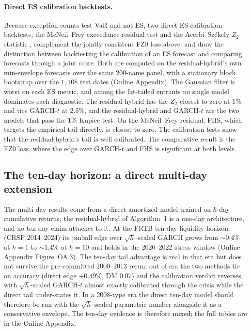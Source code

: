\documentclass[11pt]{article}
\theoremstyle{remark}
\begin{document}
\paragraph{Direct ES calibration backtests.} Because exception counts test VaR and not ES,
two direct ES calibration backtests, the McNeil--Frey exceedance-residual test \citep{mcneilfrey2000} and the Acerbi--Sz\'ekely $Z_2$ statistic \citep{acerbi2014backtesting}, complement the jointly consistent FZ0 loss above. \citet{noldeziegel2017elicitability} and \citet{bayer2022esr} draw the
distinction between backtesting the calibration of an ES forecast and comparing
forecasts through a joint score. Both are computed on the residual-hybrid's own min-envelope forecasts over the same $200$-name panel, with a stationary block bootstrap over the $1{,}108$ test dates (Online Appendix). The Gaussian filter is worst on each ES metric, and among the fat-tailed entrants no single model dominates each diagnostic. The residual-hybrid has the $Z_2$ closest to zero at $1\%$ and ties GARCH-$t$ at $2.5\%$, and the residual-hybrid and GARCH-$t$ are the two models that pass the $1\%$ Kupiec test. On the McNeil--Frey residual, FHS, which targets the empirical tail directly, is closest to zero. The calibration tests show that the residual-hybrid's tail is well calibrated. The comparative result is the FZ0 loss, where the edge over GARCH-$t$ and FHS is significant at both levels.

\subsection{The ten-day horizon: a direct multi-day extension}

The multi-day results come from a direct amortized model trained on
$h$-day cumulative returns; the residual-hybrid of Algorithm~1 is a
one-day architecture, and no ten-day claim attaches to it. At the FRTB
ten-day liquidity horizon (CRSP 2014--2024) its pinball edge over
$\sqrt{h}$-scaled GARCH grows from $\sim$0.4\% at $h=1$ to $\sim$1.4\% at
$h=10$ and holds in the 2020--2022 stress window (Online Appendix
Figure~OA.3). The ten-day tail advantage is real in that era but does not
survive the pre-committed 2000--2013 rerun: out of era the two methods
tie on accuracy (direct edge $+0.49\%$, DM 0.07) and the calibration
verdict reverses, with $\sqrt{h}$-scaled GARCH-$t$ almost exactly
calibrated through the crisis while the direct tail under-states it. In a
2008-type era the direct ten-day model should therefore be run with the
$\sqrt{h}$-scaled parametric number alongside it as a conservative
envelope. The ten-day evidence is therefore mixed; the full
tables are in the Online Appendix.
\end{document}
